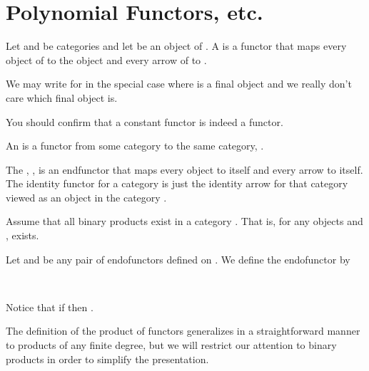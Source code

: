 \section*{Polynomial Functors, etc.}
 
Let \CCC and \DDD be categories and let  be an object of \DD\@.
A   is a functor
 that maps every object of \CCC to the
object  and every arrow of \CCC to .

\vs

We may write  for  in the special case where 
is a final object and we really don't care which final object  is.

\vs

You should confirm that a constant functor is indeed a functor.

\newslide

An  is a functor from some category \CCC
to the same category, \CC.

\vs

The , , is an endfunctor 
that maps every object to itself and every arrow to itself.  The
identity functor for a
category is just the identity arrow for that category viewed as an
object in the category
.

\newslide

Assume that all binary products exist in a category \CC.  That is,
for any objects  and ,  exists.

\vs

Let  and  be any pair of endofunctors defined on \CC.
We define the endofunctor  by

\begin{codenott}
\\
\end{codenott}

\vs

Notice that if  then
.

\newslide

The definition of the product of functors
generalizes in a straightforward manner to products of any finite degree,
but we will restrict our attention to binary products in order to simplify the presentation.

